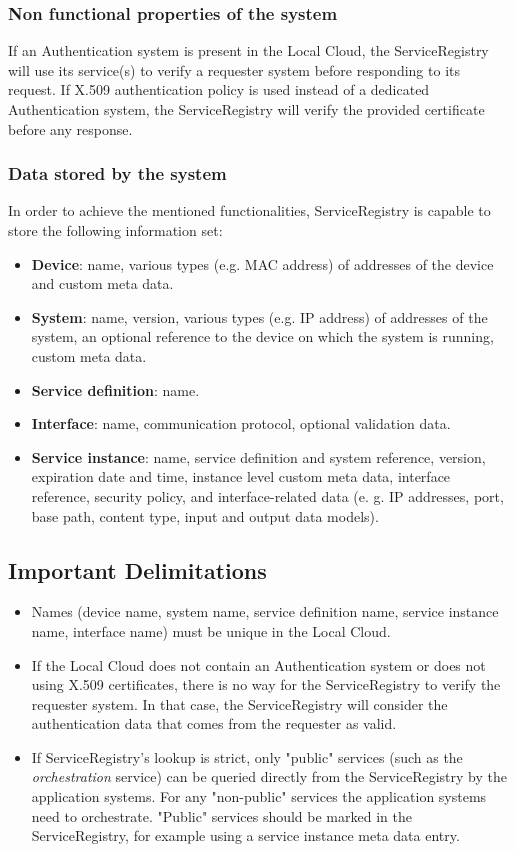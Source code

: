 \documentclass[a4paper]{arrowhead}
\begin{document}
\subsubsection {Non functional properties of the system}
If an Authentication system is present in the Local Cloud, the ServiceRegistry will use its service(s) to verify a requester system before responding to its request. If X.509 authentication policy is used instead of a dedicated Authentication system, the ServiceRegistry will verify the provided certificate before any response.

\subsubsection {Data stored by the system}
In order to achieve the mentioned functionalities, ServiceRegistry is capable to store the following information set:

\begin{itemize}
    \item \textbf{Device}: name, various types (e.g. MAC address) of addresses of the device and custom meta data.
    \item \textbf{System}: name, version, various types (e.g. IP address) of addresses of the system, an optional reference to the device on which the system is running, custom meta data. 
    \item \textbf{Service definition}: name.
    \item \textbf{Interface}: name, communication protocol, optional validation data.
    \item \textbf{Service instance}: name, service definition and system reference, version, expiration date and time, instance level custom meta data, interface reference, security policy, and interface-related data (e. g. IP addresses, port, base path, content type, input and output data models).
\end{itemize}

\subsection{Important Delimitations}
\label{sec:delimitations}

\begin{itemize}
    \item Names (device name, system name, service definition name, service instance name, interface name) must be unique in the Local Cloud.
    \item If the Local Cloud does not contain an Authentication system or does not using X.509 certificates, there is no way for the ServiceRegistry to verify the requester system. In that case, the ServiceRegistry will consider the authentication data that comes from the requester as valid.
    \item If ServiceRegistry's lookup is strict, only "public" services (such as the \textit{orchestration} service) can be queried directly from the ServiceRegistry by the application systems. For any "non-public" services the application systems need to orchestrate. "Public" services should be marked in the ServiceRegistry, for example using a service instance meta data entry.
\end{itemize}
\end{document}
